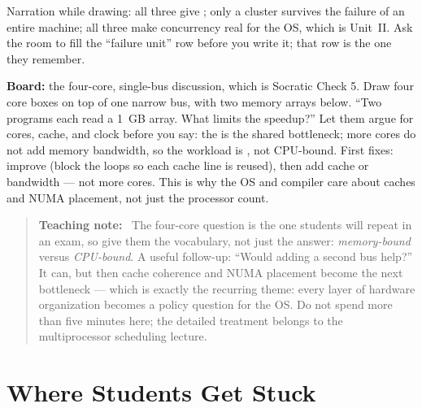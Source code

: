 \documentclass[11pt]{article}
\newenvironment{teachingaside}{\begin{quote}\small\color{primary-gold}\textbf{Teaching note:}\ }{\end{quote}}
\begin{document}
Narration while drawing: all three give ; only a cluster
survives the failure of an entire machine; all three make concurrency real for
the OS, which is Unit~II. Ask the room to fill the ``failure unit'' row before
you write it; that row is the one they remember.

\textbf{Board:} the four-core, single-bus discussion, which is Socratic Check 5.
Draw four core boxes on top of one narrow bus, with two memory arrays below.
``Two programs each read a 1~GB array. What limits the speedup?'' Let them argue
for cores, cache, and clock before you say: the  is the shared
bottleneck; more cores do not add memory bandwidth, so the workload is
, not CPU-bound. First fixes: improve  (block the
loops so each cache line is reused), then add cache or bandwidth --- not more
cores. This is why the OS and compiler care about caches and NUMA placement, not
just the processor count.

\begin{teachingaside}
The four-core question is the one students will repeat in an exam, so give them
the vocabulary, not just the answer: \emph{memory-bound} versus \emph{CPU-bound}.
A useful follow-up: ``Would adding a second bus help?'' It can, but then cache
coherence and NUMA placement become the next bottleneck --- which is exactly the
recurring theme: every layer of hardware organization becomes a policy question
for the OS. Do not spend more than five minutes here; the detailed treatment
belongs to the multiprocessor scheduling lecture.
\end{teachingaside}

\section{Where Students Get Stuck}
\end{document}
